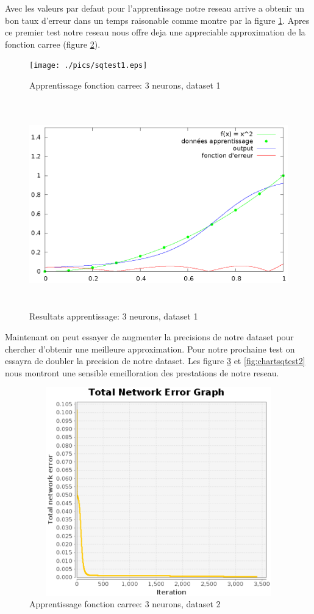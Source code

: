 \documentclass[twoside,openright,a4paper,11pt,french]{article}
\begin{document}
Avec les valeurs par defaut pour l'apprentissage notre reseau arrive a obtenir
un bon taux d'erreur dans un temps raisonable comme montre par la figure
\ref{fig:sqtest1}. Apres ce premier test notre reseau nous offre deja une
appreciable approximation de la fonction carree (figure \ref{fig:chartsqtest1}).

\begin{figure}[h]
\centering
\texttt{[image: ./pics/sqtest1.eps]}
\caption{Apprentissage fonction carree: 3 neurons, dataset 1}
\label{fig:sqtest1}
\end{figure}

\begin{figure}[h]
\centering
\includegraphics[width=12cm,height=9cm]{./pics/chartsqtest1.eps}
\caption{Resultats apprentissage: 3 neurons, dataset 1}
\label{fig:chartsqtest1}
\end{figure}

Maintenant on peut essayer de augmenter la precisions de notre dataset
pour chercher d'obtenir une meilleure approximation. Pour notre 
prochaine test on essayra de doubler la precision de notre dataset.
Les figure \ref{fig:sqtest2} et \ref{fig:chartsqtest2} nous montront une sensible 
emeilloration des prestations de notre reseau. 



\begin{figure}[h]
\centering
\includegraphics[width=12cm,height=9cm]{./pics/sqtest2.eps}
\caption{Apprentissage fonction carree: 3 neurons, dataset 2}
\label{fig:sqtest2}
\end{figure}
\end{document}
